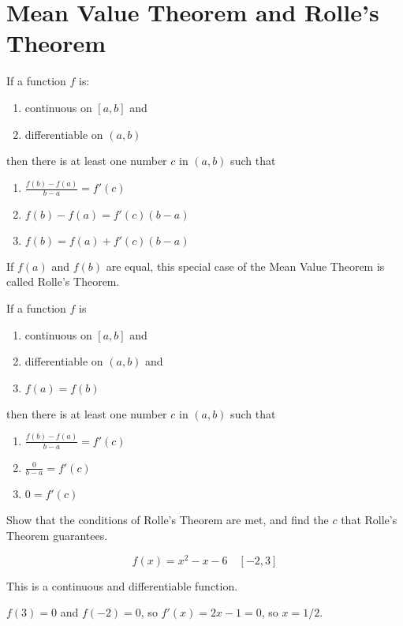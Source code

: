 \documentclass[../bccalc.tex]{subfiles}
\begin{document}
\section{Mean Value Theorem and Rolle's Theorem}
\begin{theorem}
    If a function $f$ is: 

    \begin{enumerate}
        \item continuous on $[a,b]$ and 
        \item differentiable on $(a,b)$
    \end{enumerate}
    then there is at least one number $c$ in $(a,b)$ such that 
    \begin{enumerate}
        \item $\frac{f(b)-f(a)}{b-a}=f'(c)$
        \item $f(b)-f(a)=f'(c)(b-a)$
        \item $f(b)=f(a)+f'(c)(b-a)$
    \end{enumerate}
\end{theorem}

If $f(a)$ and $f(b)$ are equal, this special case of the Mean Value Theorem is called Rolle's Theorem.
\begin{theorem}
    If a function $f$ is 
    \begin{enumerate}
        \item continuous on $[a,b]$ and 
        \item differentiable on $(a,b)$ and 
        \item $f(a)=f(b)$
    \end{enumerate}
    then there is at least one number $c$ in $(a,b)$ such that 
    \begin{enumerate}
        \item $\frac{f(b)-f(a)}{b-a}=f'(c)$
        \item $\frac{0}{b-a}=f'(c)$
        \item $0=f'(c)$
    \end{enumerate}
\end{theorem}
\pagebreak
\begin{example}
    Show that the conditions of Rolle's Theorem are met, and find the $c$ that Rolle's Theorem guarantees.

    \[ f(x)=x^2-x-6 \quad [-2,3] \]

    This is a continuous and differentiable function.

    $f(3)=0$ and $f(-2)=0$, so $f'(x)=2x-1=0$, so $x=1/2$.
\end{example}
\end{document}
